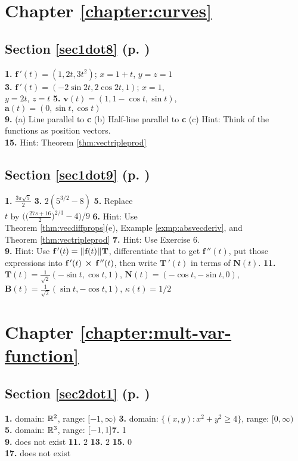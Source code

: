 \begin{multicols}{2}
\section*{Chapter \ref{chapter:curves}}
\subsection*{Section \ref{sec1dot8} (p. \pageref{sec1dot8})}
\textbf{1.} $\textbf{f}\,'(t) = (1,2t,3t^2)$; $x = 1 + t$, $y = z = 1$\\\textbf{3.} $\textbf{f}\,'(t) =
(-2\sin 2t,2\cos 2t,1)$; $x = 1$,\\$y = 2t$, $z = t$ \quad \textbf{5.} $\textbf{v}(t) = (1,1 - \cos t,\sin t)$,\\
$\textbf{a}(t) = (0,\sin t,\cos t)$\\\textbf{9.} (a) Line parallel to \textbf{c} \quad (b) Half-line parallel to
\textbf{c} \quad (c) Hint:  Think of the\\functions as position vectors.\\\textbf{15.} Hint: Theorem
\ref{thm:vectripleprod}
\subsection*{Section \ref{sec1dot9} (p. \pageref{sec1dot9})}
\textbf{1.} $\frac{3\pi \sqrt{5}}{2}$ \quad \textbf{3.} $2 (5^{3/2} - 8)$ \quad \textbf{5.} Replace\\$t$ by
$\biggl( \biggl( \frac{27s + 16}{2} \biggr)^{2/3} - 4 \biggr)\bigg/ 9$ \quad \textbf{6.} Hint: Use\\Theorem
\ref{thm:vecdiffprops}(e), Example \ref{exmp:absvecderiv}, and\\Theorem \ref{thm:vectripleprod} \quad \textbf{7.} Hint:
Use Exercise 6.\\\textbf{9.} Hint: Use $\textbf{f}\,'(t) = \lVert\mspace{1mu}\textbf{f}(t)\mspace{1mu}\rVert\textbf{T}$, differentiate that
to get $\textbf{f}\,''(t)$, put those expressions into $\textbf{f}\,'(t)\, \bm{\times} \,\textbf{f}\,''(t)$, then
write $\textbf{T}\,'(t)$ in terms of $\textbf{N}(t)$. \quad \textbf{11.} $\textbf{T}(t) = \frac{1}{\sqrt{2}}
(-\sin t,\cos t,1)$, $\textbf{N}(t) = (-\cos t,-\sin t,0)$, $\textbf{B}(t) = \frac{1}{\sqrt{2}}(\sin t,-\cos t,1)$,
$\kappa(t) = 1/2$
\section*{Chapter \ref{chapter:mult-var-function}}
\subsection*{Section \ref{sec2dot1} (p. \pageref{sec2dot1})}
\textbf{1.} domain: $\mathbb{R}^{2}$, range: $\lbrack -1,\infty )$\quad
\textbf{3.} domain: $\lbrace (x,y): x^2 + y^2 \ge 4 \rbrace$, range: $\lbrack 0,\infty)$\\\textbf{5.} domain:
$\mathbb{R}^{3}$, range: $\lbrack -1,1 \rbrack$\quad\textbf{7.} 1\\\textbf{9.} does not exist\quad
\textbf{11.} $2$\quad
\textbf{13.} $2$\quad
\textbf{15.} $0$\\\textbf{17.} does not exist

\end{multicols}
